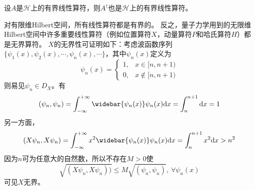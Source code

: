 \begin{theorem}
    设$A$是$\mathscr{H}$上的有界线性算符，则$A^\dagger$也是$\mathscr{H}$上的有界线性算符。
\end{theorem}

对有限维Hilbert空间，所有线性算符都是有界的。
反之，量子力学用到的无限维Hilbert空间中许多重要线性算符（例如位置算符$X$，动量算符$P$和哈氏算符$H$）都是无界算符。
$X$的无界性可证明如下：考虑波函数序列$\{\psi_1(x), \psi_2(x), \cdots, \psi_n(x), \cdots \}$，其中$\psi_n(x)$定义为
\[\psi_n(x) = \begin{cases}
    1, & x \in [n, n + 1) \\
    0, & x \notin [n, n + 1)
\end{cases}\]
则易见$\psi_n \in D_X$。有
$$(\psi_n, \psi_n) = \int^{+\infty}_{-\infty}\widebar{\psi_n(x)}\psi_n(x)\mathrm{d}x = \int^{n + 1}_n\mathrm{d}x = 1$$
另一方面，
$$(X\psi_n, X\psi_n) = \int^{+\infty}_{-\infty}x^2\widebar{\psi_n(x)}\psi_n(x)\mathrm{d}x = \int^{n + 1}_nx^2\mathrm{d}x > n^2$$
因为$n$可为任意大的自然数，所以不存在$M > 0$使
$$\sqrt{(X\psi_n, X\psi_n))} \leq M\sqrt{(\psi_n, \psi_n)}, ~ \forall \psi_n(x)$$
可见$X$无界。


